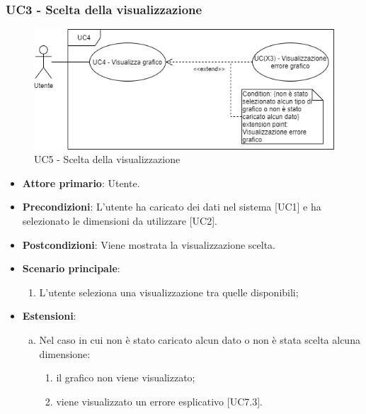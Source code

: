 \subsubsection{UC3 - Scelta della visualizzazione}
\begin{figure}[h]
\includegraphics[width=\linewidth]{section/Images/UC5SceltaVisualizzazione.png}
\centering
\caption{UC5 - Scelta della visualizzazione}
\end{figure}
\begin{itemize}
	\item \textbf{Attore primario}: Utente.
	\item \textbf{Precondizioni}: L'utente ha caricato dei dati nel sistema [UC1] e ha selezionato le dimensioni da utilizzare [UC2].
	\item \textbf{Postcondizioni}: Viene mostrata la visualizzazione scelta.
	\item \textbf{Scenario principale}:
		\begin{enumerate}
			\item L'utente seleziona una visualizzazione tra quelle disponibili;
		\end{enumerate}
	\item \textbf{Estensioni}:
	\begin{enumerate}[(a)]
		\item Nel caso in cui non è stato caricato alcun dato o non è stata scelta alcuna dimensione:
		\begin{enumerate}[1.]
			\item il grafico non viene visualizzato;
			\item viene visualizzato un errore esplicativo [UC7.3].
		\end{enumerate}
	\end{enumerate}
\end{itemize}